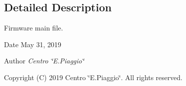 \subsection{Detailed Description}
Firmware main file. 

\begin{DoxyDate}{Date}
May 31, 2019 
\end{DoxyDate}
\begin{DoxyAuthor}{Author}
{\itshape Centro \char`\"{}\+E.\+Piaggio\char`\"{}} 
\end{DoxyAuthor}
\begin{DoxyCopyright}{Copyright}
(C) 2019 Centro \char`\"{}\+E.\+Piaggio\char`\"{}. All rights reserved. 
\end{DoxyCopyright}
